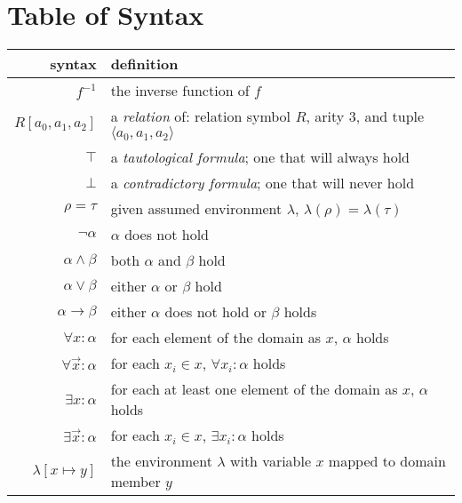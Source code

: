\section{Table of Syntax}
	\begin{tabular}{|r|l|}
		\hline
		\textbf{syntax}                  &  \textbf{definition}                                                     \\
		\hline
		$f^{-1}$                         &  the inverse function of $f$                                             \\
		\hline
		$R[a_0,a_1,a_2]$                 &  a \emph{relation} of: relation symbol $R$, arity $3$, and tuple $\langle a_0,a_1,a_2 \rangle$  \\
		$\top$                           &  a \emph{tautological formula}; one that will always hold                \\
		$\bot$                           &  a \emph{contradictory formula}; one that will never hold                \\
		$\rho = \tau$                    &  given assumed environment $\lambda$, $\lambda(\rho) = \lambda(\tau)$    \\
		$\neg \alpha$                    &  $\alpha$ does not hold                                                  \\
		$\alpha \wedge \beta$            &  both $\alpha$ and $\beta$ hold                                          \\
		$\alpha \vee \beta$              &  either $\alpha$ or $\beta$ hold                                         \\
		$\alpha \to \beta$               &  either $\alpha$ does not hold or $\beta$ holds                          \\
		$\forall x : \alpha$             &  for each element of the domain as $x$, $\alpha$ holds                   \\
		$\forall \vec{x} : \alpha$       &  for each $x_i \in x$, $\forall x_i : \alpha$ holds                      \\
		$\exists x : \alpha$             &  for each at least one element of the domain as $x$, $\alpha$ holds      \\
		$\exists \vec{x} : \alpha$       &  for each $x_i \in x$, $\exists x_i : \alpha$ holds                      \\
		\hline
		$\lambda[x \mapsto y]$           &  the environment $\lambda$ with variable $x$ mapped to domain member $y$ \\

\end{tabular}
